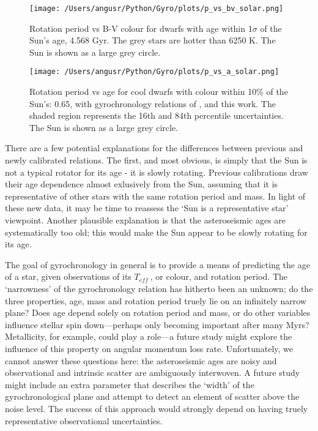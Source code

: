 \documentclass[12pt,preprint]{aastex}
\newcommand{\teff}{$T_{eff}~$}
\begin{document}
\begin{figure}[ht]
\begin{center}
\texttt{[image: /Users/angusr/Python/Gyro/plots/p\_vs\_bv\_solar.png]}
\caption{Rotation period vs B-V colour for dwarfs with age within 1$\sigma$ of the Sun's age, 4.568 Gyr. The grey stars are hotter than 6250 K. The Sun is shown as a large grey circle.}
\label{fig:p_vs_bv_solar}
\end{center}
\end{figure}

\begin{figure}[ht]
\begin{center}
\texttt{[image: /Users/angusr/Python/Gyro/plots/p\_vs\_a\_solar.png]}
\caption{Rotation period vs age for cool dwarfs with colour within 10\% of the Sun's: 0.65, with gyrochronology relations of \citet{Barnes2007}, \citet{Mamajek2008} and this work. The shaded region represents the 16th and 84th percentile uncertainties. The Sun is shown as a large grey circle.}
\label{fig:p_vs_a_solar}
\end{center}
\end{figure}

There are a few potential explanations for the differences between previous and newly calibrated relations.
The first, and most obvious, is simply that the Sun is not a typical rotator for its age - it is slowly rotating.
Previous calibrations draw their age dependence almost exlusively from the Sun, assuming that it is representative of other stars with the same rotation period and mass.
In light of these new data, it may be time to reassess the `Sun is a representative star' viewpoint.
Another plausible explanation is that the asteroseismic ages are systematically too old; this would make the Sun appear to be slowly rotating for its age.


The goal of gyrochronology in general is to provide a means of predicting the age of a star, given observations of its \teff, or colour, and rotation period.
The `narrowness' of the gyrochronology relation has hitherto been an unknown; do the three properties, age, mass and rotation period truely lie on an infinitely narrow plane?
Does age depend solely on rotation period and mass, or do other variables influence stellar spin down---perhaps only becoming important after many Myrs?
Metallicity, for example, could play a role---a future study might explore the influence of this property on angular momentum loss rate.
Unfortunately, we cannot answer these questions here: the asteroseismic ages are noisy and observational and intrinsic scatter are ambiguously interwoven.
A future study might include an extra parameter that describes the `width' of the gyrochronological plane and attempt to detect an element of scatter above the noise level.
The success of this approach would strongly depend on having truely representative observational uncertainties.
\end{document}
